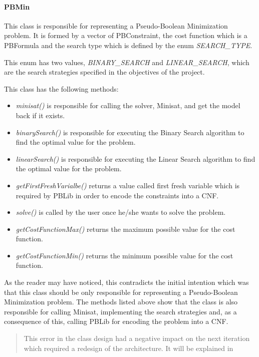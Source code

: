 


\paragraph{PBMin} 

This class is responsible for representing a Pseudo-Boolean Minimization problem.  It is formed by a vector of PBConstraint, the cost function which is a PBFormula and the search type which is defined by the enum \emph{SEARCH\_TYPE}.  

This enum has two values, \emph{BINARY\_SEARCH} and \emph{LINEAR\_SEARCH}, which are the search strategies specified in the objectives of the project.  



This class has the following methods: 
\begin{itemize}
	\item \emph{minisat()} is responsible for calling the solver, Minisat, and get the model back if it exists.
	\item \emph{binarySearch()} is responsible for executing the Binary Search algorithm to find the optimal value for the problem.
	\item \emph{linearSearch()} is responsible for executing the Linear Search algorithm to find the optimal value for the problem.
	\item \emph{getFirstFreshVarialbe()} returns a value called first fresh variable which is required by PBLib in order to encode the constraints into a CNF.
	\item \emph{solve()} is called by the user once he/she wants to solve the problem.
	\item \emph{getCostFunctionMax()} returns the maximum possible value for the cost function.
	\item \emph{getCostFunctionMin()} returns the minimum possible value for the cost function.
\end{itemize}

As the reader may have noticed, this contradicts the initial intention which was that this class should be only responsible for representing a Pseudo-Boolean Minimization problem. The methods listed above show that the class is also responsible for calling Minisat, implementing the search strategies and, as a consequence of this, calling PBLib for encoding the problem into a CNF.  

\begin{verse}
	This error in the class design had a negative impact on the next iteration which required a redesign of the architecture. It will be explained in
\end{verse}

